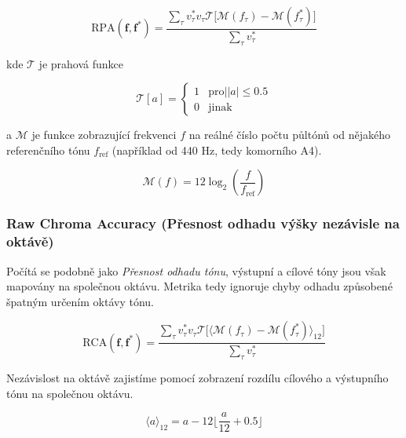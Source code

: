     $$\mathrm{RPA}(\mathbf{f}, \mathbf{f^*}) = \frac{\sum_\tau{v^*_\tau v_\tau \mathcal{T}[\mathcal{M}(f_\tau) - \mathcal{M}(f^*_\tau)}] }{\sum_\tau{v^*_\tau}}$$

kde $\mathcal{T}$ je prahová funkce

    \begin{equation*}
        \mathcal{T}[a] = \begin{cases}
                1 & \mathrm{pro} \lvert |a| \le 0.5 \\
                0 & \text{jinak}
                
            \end{cases}
    \end{equation*}

a $\mathcal{M}$ je funkce zobrazující frekvenci $f$ na reálné číslo počtu půltónů od nějakého referenčního tónu $f_{\mathrm{ref}}$ (například od 440 Hz, tedy komorního A4).

    $$\mathcal{M}(f) = 12 \log_2(\frac{f}{f_{\mathrm{ref}}})$$





\subsubsection{Raw Chroma Accuracy (Přesnost odhadu výšky nezávisle na oktávě)}

Počítá se podobně jako \textit{Přesnost odhadu tónu}, výstupní a cílové tóny jsou však mapovány na společnou oktávu. Metrika tedy ignoruje chyby odhadu způsobené špatným určením oktávy tónu.

    $$\mathrm{RCA}(\mathbf{f}, \mathbf{f^*}) = \frac{\sum_\tau{v^*_\tau v_\tau \mathcal{T}[\langle \mathcal{M}(f_\tau) - \mathcal{M}(f^*_\tau)} \rangle_{12}] }{\sum_\tau{v^*_\tau}}$$

Nezávislost na oktávě zajistíme pomocí zobrazení rozdílu cílového a výstupního tónu na společnou oktávu.

    $$\langle a \rangle_{12} = a - 12 \lfloor \frac{a}{12} + 0.5 \rfloor  $$




